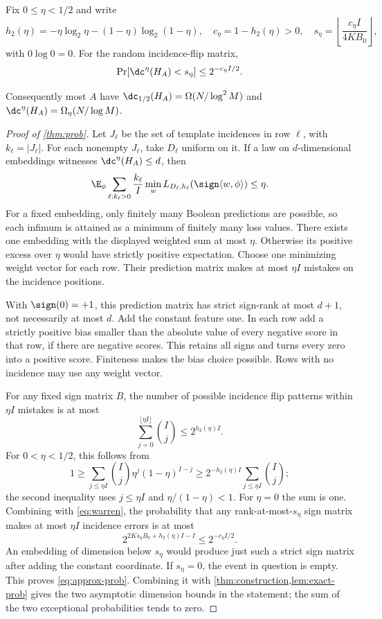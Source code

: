 \begin{theorem}\label{thm:prob}
Fix $0\le\eta<1/2$ and write
\[
 h_2(\eta)=-\eta\log_2\eta-(1-\eta)\log_2(1-\eta),\quad
 c_\eta=1-h_2(\eta)>0,
 \quad s_\eta=\left\lfloor\frac{c_\eta I}{4KB_0}\right\rfloor,
\]
with $0\log 0=0$. For the random incidence-flip matrix,
\begin{equation}\label{eq:approx-prob}
 \Pr[\dc^\eta(H_A)<s_\eta]\le2^{-c_\eta I/2}.
\end{equation}

Consequently most $A$ have $\dc_{1/2}(H_A)=\Omega(N/\log^2M)$ and $\dc^\eta(H_A)=\Omega_\eta(N/\log M)$.
\end{theorem}

\begin{proof}[Proof of \cref{thm:prob}]
Let $J_\ell$ be the set of template incidences in row $\ell$, with $k_\ell=|J_\ell|$. For each nonempty $J_\ell$, take $D_\ell$ uniform on it. If a law on $d$-dimensional embeddings witnesses $\dc^\eta(H_A)\le d$, then
\[
 \E_\phi\sum_{\ell:k_\ell>0}\frac{k_\ell}{I}
       \min_w L_{D_\ell,h_\ell}(\sign\langle w,\phi\rangle)\le\eta.
\]
For a fixed embedding, only finitely many Boolean predictions are possible, so each infimum is attained as a minimum of finitely many loss values. There exists one embedding with the displayed weighted sum at most $\eta$. Otherwise its positive excess over $\eta$ would have strictly positive expectation. Choose one minimizing weight vector for each row. Their prediction matrix makes at most $\eta I$ mistakes on the incidence positions.

With $\sign(0)=+1$, this prediction matrix has strict sign-rank at most $d+1$, not necessarily at most $d$. Add the constant feature one. In each row add a strictly positive bias smaller than the absolute value of every negative score in that row, if there are negative scores. This retains all signs and turns every zero into a positive score. Finiteness makes the bias choice possible. Rows with no incidence may use any weight vector.

For any fixed sign matrix $B$, the number of possible incidence flip patterns within $\eta I$ mistakes is at most
\[
 \sum_{j=0}^{\lfloor\eta I\rfloor}\binom Ij\le2^{h_2(\eta)I}.
\]
For $0<\eta<1/2$, this follows from
\[
 1\ge\sum_{j\le\eta I}\binom Ij\eta^j(1-\eta)^{I-j}
 \ge2^{-h_2(\eta)I}\sum_{j\le\eta I}\binom Ij;
\]
the second inequality uses $j\le\eta I$ and $\eta/(1-\eta)<1$. For $\eta=0$ the sum is one. Combining with \eqref{eq:warren}, the probability that any rank-at-most-$s_\eta$ sign matrix makes at most $\eta I$ incidence errors is at most
\[
 2^{2Ks_\eta B_0+h_2(\eta)I-I}\le2^{-c_\eta I/2}.
\]
An embedding of dimension below $s_\eta$ would produce just such a strict sign matrix after adding the constant coordinate. If $s_\eta=0$, the event in question is empty. This proves \eqref{eq:approx-prob}. Combining it with \cref{thm:construction,lem:exact-prob} gives the two asymptotic dimension bounds in the statement; the sum of the two exceptional probabilities tends to zero.
\end{proof}
